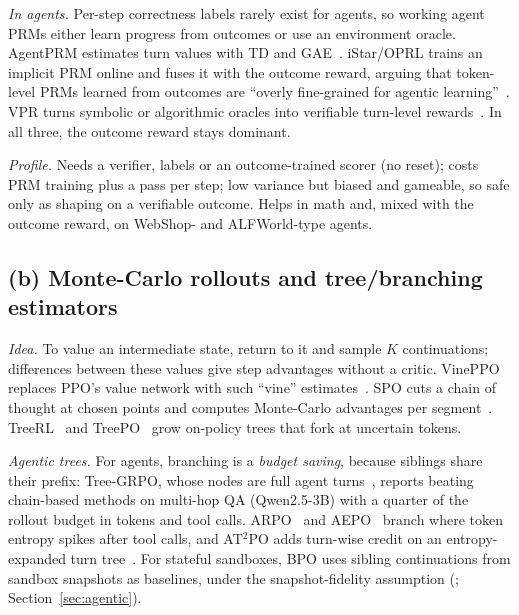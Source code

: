 \emph{In agents.} Per-step correctness labels rarely exist for agents, so working agent PRMs either learn progress from outcomes or use an environment oracle. AgentPRM estimates turn values with TD and GAE~\citep{xi2025agentprm}\unverified. iStar/OPRL trains an implicit PRM online and fuses it with the outcome reward, arguing that token-level PRMs learned from outcomes are ``overly fine-grained for agentic learning''~\citep{istar2025online}. VPR turns symbolic or algorithmic oracles into verifiable turn-level rewards~\citep{vpr2026verifiable}. In all three, the outcome reward stays dominant.

\emph{Profile.} Needs a verifier, labels or an outcome-trained scorer (no reset); costs PRM training plus a pass per step; low variance but biased and gameable, so safe only as shaping on a verifiable outcome. Helps in math and, mixed with the outcome reward, on WebShop- and ALFWorld-type agents.

\subsection{(b) Monte-Carlo rollouts and tree/branching estimators}\label{sec:tax-mc}

\emph{Idea.} To value an intermediate state, return to it and sample $K$ continuations; differences between these values give step advantages without a critic. VinePPO replaces PPO's value network with such ``vine'' estimates~\citep{kazemnejad2024vineppo}\unverified. SPO cuts a chain of thought at chosen points and computes Monte-Carlo advantages per segment~\citep{guo2025segment}\unverified. TreeRL~\citep{hou2025treerl}\unverified{} and TreePO~\citep{li2025treepo}\unverified{} grow on-policy trees that fork at uncertain tokens.

\emph{Agentic trees.} For agents, branching is a \emph{budget saving}, because siblings share their prefix: Tree-GRPO, whose nodes are full agent turns~\citep{ji2025tree}, reports beating chain-based methods on multi-hop QA (Qwen2.5-3B) with a quarter of the rollout budget in tokens and tool calls. ARPO~\citep{dong2025agentic}\unverified{} and AEPO~\citep{dong2025agenticentropy}\unverified{} branch where token entropy spikes after tool calls, and AT$^2$PO adds turn-wise credit on an entropy-expanded turn tree~\citep{at2po2026agentic}\unverified. For stateful sandboxes, BPO uses sibling continuations from sandbox snapshots as baselines, under the snapshot-fidelity assumption (\citealp{bpo2026branching}; Section~\ref{sec:agentic}).

